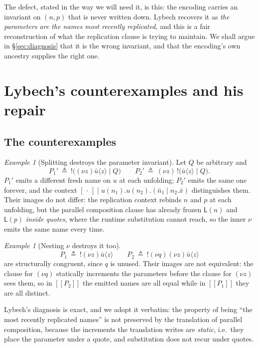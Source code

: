 \documentclass[11pt]{article}
\theoremstyle{definition}
\theoremstyle{plain}
\theoremstyle{remark}
\newtheorem{example}[definition]{Example}
\newcommand{\enc}[1]{[\![#1]\!]}
\newcommand{\Lft}{\mathsf{L}}
\begin{document}
The defect, stated in the way we will need it, is this: the encoding
carries an invariant on $(n,p)$ that is never written down. Lybech
recovers it as \emph{the parameters are the names most recently
replicated}, and this is a fair reconstruction of what the replication
clause is trying to maintain. We shall argue in \S\ref{sec:diagnosis}
that it is the wrong invariant, and that the encoding's own ancestry
supplies the right one.

\section{Lybech's counterexamples and his repair}\label{sec:lybech}

\subsection{The counterexamples}

\begin{example}[Splitting destroys the parameter invariant]\label{ex:ce1}
Let $Q$ be arbitrary and
\[
P_1' \ \triangleq\ !\big((\nu z)\bar u \langle z\rangle \mid Q\big)
\qquad
P_2' \ \triangleq\ (\nu z)\,!\big(\bar u \langle z\rangle \mid Q\big).
\]
$P_1'$ emits a different fresh name on $u$ at each unfolding; $P_2'$
emits the same one forever, and the context
$[\,\cdot\,] \mid u(n_1).u(n_2).(\bar n_1 \mid n_2.\bar x)$
distinguishes them. Their images do not differ: the replication context
rebinds $n$ and $p$ at each unfolding, but the parallel composition
clause has already frozen $\Lft(n)$ and $\Lft(p)$ \emph{inside quotes},
where the runtime substitution cannot reach, so the inner $\nu$ emits the
same name every time.
\end{example}

\begin{example}[Nesting $\nu$ destroys it too]\label{ex:ce2}
\[
P_1 \ \triangleq\ !(\nu z)\bar u\langle z\rangle
\qquad
P_2 \ \triangleq\ !(\nu q)(\nu z)\bar u\langle z\rangle
\]
are structurally congruent, since $q$ is unused. Their images are not
equivalent: the clause for $(\nu q)$ statically increments the parameters
before the clause for $(\nu z)$ sees them, so in $\enc{P_2}$ the emitted
names are all equal while in $\enc{P_1}$ they are all distinct.
\end{example}

Lybech's diagnosis is exact, and we adopt it verbatim: the property of
being ``the most recently replicated names'' is not preserved by the
translation of parallel composition, because the increments the
translation writes are \emph{static}, i.e.\ they place the parameter
under a quote, and substitution does not recur under quotes.
\end{document}

